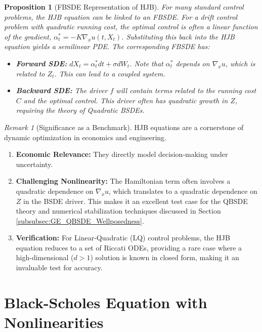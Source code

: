 \documentclass[11pt,letterpaper,oneside]{article}
\theoremstyle{plain}
\newtheorem{proposition}[theorem]{Proposition}
\theoremstyle{definition}
\theoremstyle{remark}
\newtheorem{remark}{Remark}[section]
\begin{document}
\begin{proposition}[FBSDE Representation of HJB]
For many standard control problems, the HJB equation can be linked to an FBSDE. For a drift control problem with quadratic running cost, the optimal control is often a linear function of the gradient, \(\alpha_t^* = -K \nabla_x u(t,X_t)\). Substituting this back into the HJB equation yields a semilinear PDE. The corresponding FBSDE has:
\begin{itemize}
    \item \textbf{Forward SDE:} \(dX_t = \alpha_t^* dt + \sigma dW_t\). Note that \(\alpha_t^*\) depends on \(\nabla_x u\), which is related to \(Z_t\). This can lead to a coupled system.
    \item \textbf{Backward SDE:} The driver \(f\) will contain terms related to the running cost \(C\) and the optimal control. This driver often has quadratic growth in $Z$, requiring the theory of Quadratic BSDEs.
\end{itemize}
\end{proposition}

\begin{remark}[Significance as a Benchmark]
HJB equations are a cornerstone of dynamic optimization in economics and engineering.
\begin{enumerate}
    \item \textbf{Economic Relevance:} They directly model decision-making under uncertainty.
    \item \textbf{Challenging Nonlinearity:} The Hamiltonian term often involves a quadratic dependence on \(\nabla_x u\), which translates to a quadratic dependence on \(Z\) in the BSDE driver. This makes it an excellent test case for the QBSDE theory and numerical stabilization techniques discussed in Section \ref{subsubsec:GE_QBSDE_Wellposedness}.
    \item \textbf{Verification:} For Linear-Quadratic (LQ) control problems, the HJB equation reduces to a set of Riccati ODEs, providing a rare case where a high-dimensional (\(d>1\)) solution is known in closed form, making it an invaluable test for accuracy.
\end{enumerate}
\end{remark}

\section{Black-Scholes Equation with Nonlinearities}
\label{sec:nonlinear_bs}
\end{document}
